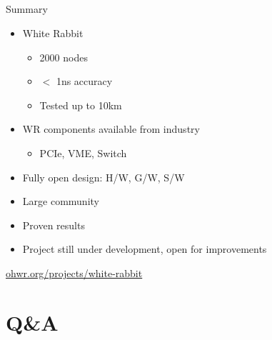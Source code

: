\documentclass[compress,red]{beamer}
\begin{document}
\subsection{}
\begin{frame}{Summary}


    \begin{itemize}
      \item White Rabbit
      \begin{itemize}
	\item 2000 nodes
	\item $<$ 1ns accuracy
	\item Tested up to 10km
      \end{itemize}
      \item WR components available from industry
      \begin{itemize}
	\item PCIe, VME, Switch
      \end{itemize}
      \item Fully open design: H/W, G/W, S/W
      \item Large community
      \item Proven results
      \item Project still under development, open for improvements

    \end{itemize}    

\begin{center}
\href{http://ohwr.org/projects/white-rabbit}{ohwr.org/projects/white-rabbit}
\end{center}

 
\end{frame}
\section{Q\&A}
\end{document}
